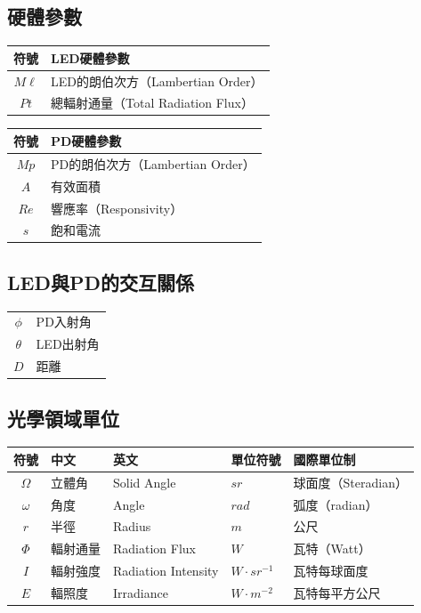\onehalfspacing

\subsection*{硬體參數}

\begin{longtable}[l]{cl}
    符號 & LED硬體參數\\ \hline
    $M\ell$ & LED的朗伯次方（Lambertian Order）\\
    $Pt$ & 總輻射通量（Total Radiation Flux） 
\end{longtable}

\begin{longtable}[l]{cl}
    符號 & PD硬體參數\\ \hline
    $Mp$ & PD的朗伯次方（Lambertian Order）\\
    $A$ & 有效面積\\
    $Re$ & 響應率（Responsivity）\\
    $s$ &飽和電流
\end{longtable}


\onehalfspacing

\subsection*{LED與PD的交互關係}

\begin{longtable}[l]{cl}
    $\phi$ & PD入射角\\
    $\theta$ & LED出射角\\
    $D$&距離\\
\end{longtable}

\onehalfspacing

\subsection*{光學領域單位}

\begin{longtable}[l]{cllll}
    符號& 中文& 英文 & 單位符號&國際單位制\\\hline
    $\Omega$ & 立體角&Solid Angle& $sr$&球面度（Steradian） \\
    $\omega$ & 角度&Angle& $rad$&弧度（radian）\\
    $r$ & 半徑&Radius&  $m$ &公尺\\
    $\Phi$ & 輻射通量&Radiation Flux& $W$&瓦特（Watt）\\
    $I$ & 輻射強度&Radiation Intensity & $W\cdot sr^{-1}$&瓦特每球面度 \\
    $E$ & 輻照度&Irradiance&$W\cdot m^{-2}$ &瓦特每平方公尺\\
\end{longtable}


